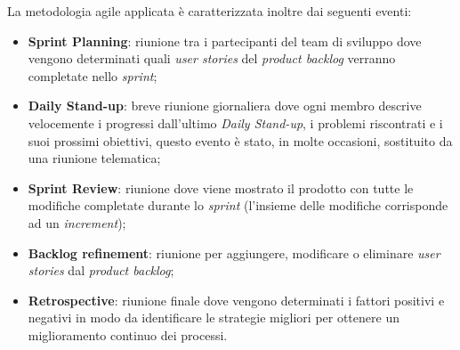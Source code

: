 \noindent
La metodologia agile applicata è caratterizzata inoltre dai seguenti eventi:
\begin{itemize}
	\item \textbf{Sprint Planning}: riunione tra i partecipanti del team di sviluppo dove vengono determinati quali \emph{user stories} del \emph{product backlog} verranno completate nello \emph{sprint};
	
	\item \textbf{Daily Stand-up}: breve riunione giornaliera dove ogni membro descrive velocemente i progressi dall'ultimo \emph{Daily Stand-up}, i problemi riscontrati e i suoi prossimi obiettivi, questo evento è stato, in molte occasioni, sostituito da una riunione telematica;
	
	\item \textbf{Sprint Review}: riunione dove viene mostrato il prodotto con tutte le modifiche completate durante lo \emph{sprint} (l'insieme delle modifiche corrisponde ad un \emph{increment});
	
	\item \textbf{Backlog refinement}: riunione per aggiungere, modificare o eliminare \emph{user stories} dal \emph{product backlog};
	
	\item \textbf{Retrospective}: riunione finale dove vengono determinati i fattori positivi e negativi in modo da identificare le strategie migliori per ottenere un miglioramento continuo dei processi.
\end{itemize}
\noindent

